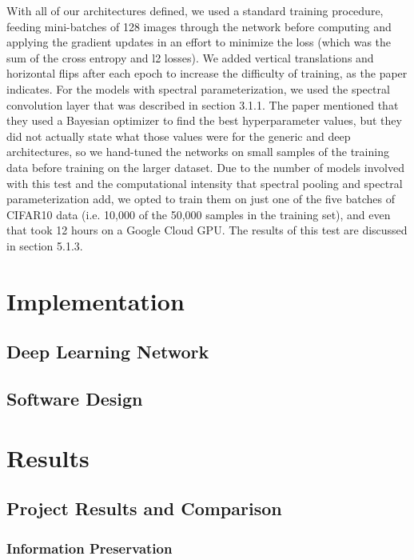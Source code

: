 \documentclass[10pt,journal,compsoc]{IEEEtran}
\begin{document}
With all of our architectures defined, we used a standard training procedure, feeding mini-batches of 128 images through the network before computing and applying the gradient updates in an effort to minimize the loss (which was the sum of the cross entropy and l2 losses). We added vertical translations and horizontal flips after each epoch to increase the difficulty of training, as the paper indicates. For the models with spectral parameterization, we used the spectral convolution layer that was described in section 3.1.1. The paper mentioned that they used a Bayesian optimizer to find the best hyperparameter values, but they did not actually state what those values were for the generic and deep architectures, so we hand-tuned the networks on small samples of the training data before training on the larger dataset. Due to the number of models involved with this test and the computational intensity that spectral pooling and spectral parameterization add, we opted to train them on just one of the five batches of CIFAR10 data (i.e. 10,000 of the 50,000 samples in the training set), and even that took 12 hours on a Google Cloud GPU. The results of this test are discussed in section 5.1.3.

\section{Implementation}

\subsection{Deep Learning Network}

\subsection{Software Design}

\section{Results}

\subsection{Project Results and Comparison}

\subsubsection{Information Preservation}
\end{document}
